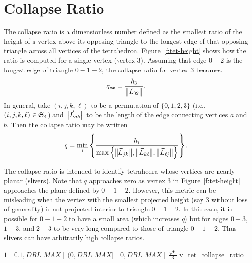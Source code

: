 \section{Collapse Ratio}

The collapse ratio is a dimensionless number defined as the smallest ratio of the
height of a vertex above its opposing triangle to the longest edge of that opposing
triangle across all vertices of the tetrahedron. Figure~\ref{f:tet-height} shows
how the ratio is computed for a single vertex (vertex $3$). Assuming that edge $0-2$
is the longest edge of triangle $0-1-2$, the collapse ratio for vertex $3$ becomes:
\[
  q_{ex} = \frac{h_3}{\big\lVert{\vec L_{02}}\big\rVert}.
\]
In general, take $(i,j,k,\ell)$ to be a permutation of $\{0,1,2,3\}$
(i.e., $(i,j,k,\ell)\in\mathfrak{S}_4$) and $\big\lVert{\vec L_{ab}}\big\rVert$ to be the length of the edge
connecting vertices $a$ and $b$.
Then the collapse ratio may be written
\[
  q = \min_i\left\{\frac{h_i}{\max\left\{\big\lVert{\vec L_{jk}}\big\rVert,\big\lVert{\vec L_{k\ell}}\big\rVert,\big\lVert{\vec L_{\ell j}}\big\rVert\right\}}\right\}.
\]

The collapse ratio is intended to identify tetrahedra whose vertices are nearly planar (slivers).
Note that $q$ approaches zero as vertex $3$ in
Figure~\ref{f:tet-height} approaches the plane defined by $0-1-2$.
However, this metric can be misleading when the vertex with the smallest projected height
(say $3$ without loss of generality) is not projected interior to triangle $0-1-2$.
In this case, it is possible for $0-1-2$ to have a small area (which increases $q$) but
for edges $0-3$, $1-3$, and $2-3$ to be very long compared to those of triangle $0-1-2$.
Thus slivers can have arbitrarily high collapse ratios.

%
{$1$}%
{$[0.1,DBL\_MAX]$}%
{$(0,DBL\_MAX]$}%
{$[0,DBL\_MAX]$}%
{$\frac{\sqrt{6}}{3}$}%
{\cite{patran:03}}%
{v\_tet\_collapse\_ratio}%


